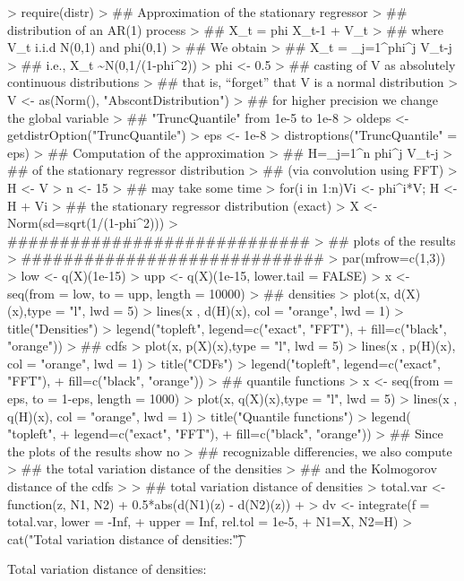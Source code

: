 \documentclass[11pt]{article}
\begin{document}
\begin{Schunk}
\begin{Sinput}
> require(distr)
> ## Approximation of the stationary regressor
> ## distribution of an AR(1) process
> ##       X_t = phi X_{t-1} + V_t
> ## where V_t i.i.d N(0,1) and phi\in(0,1)
> ## We obtain
> ##    X_t = \sum_{j=1}^\infty phi^j V_{t-j}
> ## i.e., X_t \sim N(0,1/(1-phi^2))
> phi <- 0.5
> ## casting of V as absolutely continuous distributions
> ## that is, ``forget'' that V is a normal distribution
> V <- as(Norm(), "AbscontDistribution")
> ## for higher precision we change the global variable
> ## "TruncQuantile" from 1e-5 to 1e-8
> oldeps <- getdistrOption("TruncQuantile")
> eps <- 1e-8
> distroptions("TruncQuantile" = eps)
> ## Computation of the approximation
> ##      H=\sum_{j=1}^n phi^j V_{t-j}
> ## of the stationary regressor distribution
> ## (via convolution using FFT)
> H <- V
> n <- 15
> ## may take some time
> for(i in 1:n){Vi <- phi^i*V; H <- H + Vi }
> ## the stationary regressor distribution (exact)
> X <- Norm(sd=sqrt(1/(1-phi^2)))
> #############################
> ## plots of the results
> #############################
> par(mfrow=c(1,3))
> low <- q(X)(1e-15)
> upp <- q(X)(1e-15, lower.tail = FALSE)
> x <- seq(from = low, to = upp, length = 10000)
> ## densities
> plot(x, d(X)(x),type = "l", lwd = 5)
> lines(x , d(H)(x), col = "orange", lwd = 1)
> title("Densities")
> legend("topleft", legend=c("exact", "FFT"),
+         fill=c("black", "orange"))
> ## cdfs
> plot(x, p(X)(x),type = "l", lwd = 5)
> lines(x , p(H)(x), col = "orange", lwd = 1)
> title("CDFs")
> legend("topleft", legend=c("exact", "FFT"),
+         fill=c("black", "orange"))
> ## quantile functions
> x <- seq(from = eps, to = 1-eps, length = 1000)
> plot(x, q(X)(x),type = "l", lwd = 5)
> lines(x , q(H)(x), col = "orange", lwd = 1)
> title("Quantile functions")
> legend( "topleft",
+         legend=c("exact", "FFT"),
+         fill=c("black", "orange"))
> ## Since the plots of the results show no
> ## recognizable differencies, we also compute
> ## the total variation distance of the densities
> ## and the Kolmogorov distance of the cdfs
>
> ## total variation distance of densities
> total.var <- function(z, N1, N2){
+     0.5*abs(d(N1)(z) - d(N2)(z))
+ }
> dv <- integrate(f = total.var, lower = -Inf,
+                 upper = Inf, rel.tol = 1e-5,
+                 N1=X, N2=H)
> cat("Total variation distance of densities:\t")
\end{Sinput}
\begin{Soutput}
Total variation distance of densities:

\end{Soutput}
\end{Schunk}
\end{document}
